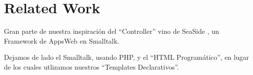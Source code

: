 \section{Related Work}

Gran parte de nuestra inspiración del ``Controller'' vino de SeaSide \cite{seaside}, un Framework de AppsWeb en Smalltalk.

Dejamos de lado el Smalltalk, usando PHP, y el ``HTML Programático'', en lugar de los cuales utlizamos nuestros ``Templates Declarativos''.
